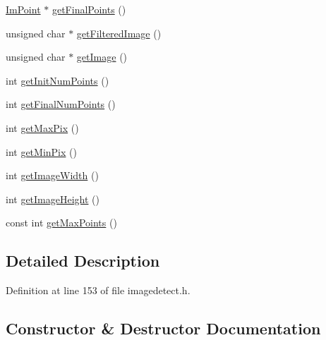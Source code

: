 \begin{DoxyCompactItemize}
\item 
\mbox{\hyperlink{struct_im_point}{Im\+Point}} $\ast$ \mbox{\hyperlink{class_image_detect_a8a27f31e31b2a7671194536d8187ba57}{get\+Final\+Points}} ()
\item 
unsigned char $\ast$ \mbox{\hyperlink{class_image_detect_ad825631c35588b68c69911097b2d26de}{get\+Filtered\+Image}} ()
\item 
unsigned char $\ast$ \mbox{\hyperlink{class_image_detect_aa5bf3a0fbc4dd9b377abf6cfdb86f054}{get\+Image}} ()
\item 
int \mbox{\hyperlink{class_image_detect_a44343ed4640409fea5062b82ceb421c6}{get\+Init\+Num\+Points}} ()
\item 
int \mbox{\hyperlink{class_image_detect_a40764a69b1ea845b170c006150561d5b}{get\+Final\+Num\+Points}} ()
\item 
int \mbox{\hyperlink{class_image_detect_acd993d239569845c322f5956c7370911}{get\+Max\+Pix}} ()
\item 
int \mbox{\hyperlink{class_image_detect_ac0d3d2046393acd84b358ea653662456}{get\+Min\+Pix}} ()
\item 
int \mbox{\hyperlink{class_image_detect_afd28916cc8e9627eed3e47757b770258}{get\+Image\+Width}} ()
\item 
int \mbox{\hyperlink{class_image_detect_a68a50fce55888eb61c8cd13b9e89a2d6}{get\+Image\+Height}} ()
\item 
const int \mbox{\hyperlink{class_image_detect_a0df3a01d26a8fbf8383f5980f430ba03}{get\+Max\+Points}} ()
\end{DoxyCompactItemize}


\subsection{Detailed Description}


Definition at line 153 of file imagedetect.\+h.



\subsection{Constructor \& Destructor Documentation}
\mbox{\label{class_image_detect_a2ea78db5ab4e9e09bfd4853919c9351e}} 
